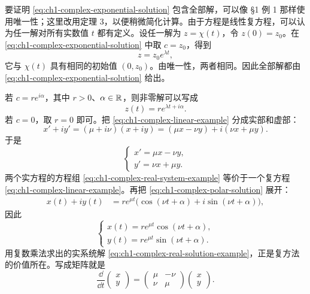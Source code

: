 要证明 \eqref{eq:ch1-complex-exponential-solution} 包含全部解，可以像 §1 例 1 那样使用唯一性；这里改用定理 3，以便稍微简化计算。由于方程是线性复方程，可以认为任一解对所有实数值 \(t\) 都有定义。设任一解为 \(z=\chi(t)\)，令 \(z(0)=z_0\)。在 \eqref{eq:ch1-complex-exponential-solution} 中取 \(c=z_0\)，得到
\[
 z=z_0e^{\lambda t},
\]
它与 \(\chi(t)\) 具有相同的初始值 \((0,z_0)\)。由唯一性，两者相同。因此全部解都由 \eqref{eq:ch1-complex-exponential-solution} 给出。

若 \(c=re^{i\alpha}\)，其中 \(r>0\)、\(\alpha\in\mathbb R\)，则非零解可以写成
\begin{equation}
 z(t)=re^{\lambda t+i\alpha}.
 \label{eq:ch1-complex-polar-solution}
\end{equation}
若 \(c=0\)，取 \(r=0\) 即可。把 \eqref{eq:ch1-complex-linear-example} 分成实部和虚部：
\[
 x'+iy'=(\mu+i\nu)(x+iy)
 =(\mu x-\nu y)+i(\nu x+\mu y).
\]
于是
\begin{equation}
 \begin{cases}
  x'=\mu x-\nu y,\\
  y'=\nu x+\mu y.
 \end{cases}
 \label{eq:ch1-complex-real-system-example}
\end{equation}
两个实方程的方程组 \eqref{eq:ch1-complex-real-system-example} 等价于一个复方程 \eqref{eq:ch1-complex-linear-example}。再把 \eqref{eq:ch1-complex-polar-solution} 展开：
\[
 \begin{aligned}
 x(t)+iy(t)
 &=re^{\mu t}
 \bigl(\cos(\nu t+\alpha)+i\sin(\nu t+\alpha)\bigr),
 \end{aligned}
\]
因此
\begin{equation}
 \begin{cases}
  x(t)=re^{\mu t}\cos(\nu t+\alpha),\\
  y(t)=re^{\mu t}\sin(\nu t+\alpha).
 \end{cases}
 \label{eq:ch1-complex-real-solution-example}
\end{equation}
用复数乘法求出的实系统解 \eqref{eq:ch1-complex-real-solution-example}，正是复方法的价值所在。写成矩阵就是
\[
 \frac{\dd}{\dd t}
 \begin{pmatrix}
  x\\y
 \end{pmatrix}
 =
 \begin{pmatrix}
  \mu&-\nu\\
  \nu&\mu
 \end{pmatrix}
 \begin{pmatrix}
  x\\y
 \end{pmatrix}.
\]

